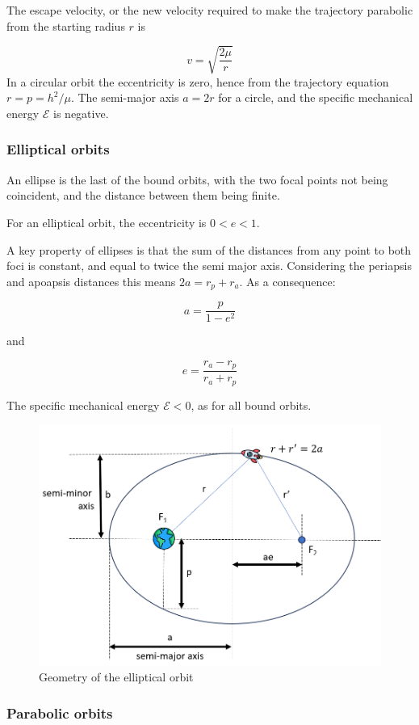 \documentclass{report}
\begin{document}
The escape velocity, or the new velocity required to make the trajectory parabolic from the starting radius $r$ is

$$
v = \sqrt{\frac{2\mu}{r}}
$$
In a circular orbit the eccentricity is zero, hence from the trajectory equation $r = p =h^2 /\mu$. The semi-major axis $a = 2r$ for a circle, and the specific mechanical energy $\mathcal{E}$ is negative.

\subsubsection{Elliptical orbits}
An ellipse is the last of the bound orbits, with the two focal points not being coincident, and the distance between them being finite.

For an elliptical orbit, the eccentricity is $0<e<1$. 

A key property of ellipses is that the sum of the distances from any point to both foci is constant, and equal to twice the semi major axis. Considering the periapsis and apoapsis distances this means $2a = r_p + r_a$. As a consequence:

$$
a = \frac{p}{1-e^2}
$$

and

$$
e = \frac{r_a - r_p}{r_a + r_p}
$$

The specific mechanical energy $\mathcal{E}<0$, as for all bound orbits. 

\begin{figure}[H]
    \centering
    \includegraphics[width=0.8\linewidth]{Latex Images/EllipticalOrbit.png}
    \caption{Geometry of the elliptical orbit}
    \label{fig:EllipticalOrbit}
\end{figure}

\subsubsection{Parabolic orbits}
\end{document}
